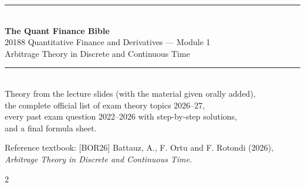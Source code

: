 \documentclass[11pt,a4paper,oneside]{book}
\begin{document}
\begin{titlepage}
\centering
\vspace*{3cm}
{\color{chapcol}\rule{\textwidth}{1.5pt}}\\[0.6cm]
{\Huge\bfseries\color{chapcol} The Quant Finance Bible\\[0.4cm]}
{\Large 20188 Quantitative Finance and Derivatives --- Module 1\\[0.2cm]
Arbitrage Theory in Discrete and Continuous Time}\\[0.4cm]
{\color{chapcol}\rule{\textwidth}{1.5pt}}\\[1.5cm]
{\large Theory from the lecture slides (with the material given orally added),\\
the complete official list of exam theory topics 2026--27,\\
every past exam question 2022--2026 with step-by-step solutions,\\
and a final formula sheet.}\\[2cm]
\vfill
{\small Reference textbook: [BOR26] Battauz, A., F. Ortu and F. Rotondi (2026), \emph{Arbitrage Theory in Discrete and Continuous Time}.}
\end{titlepage}
\begin{multicols}{2}
\tableofcontents
\end{multicols}
\clearpage
{}
\end{document}

